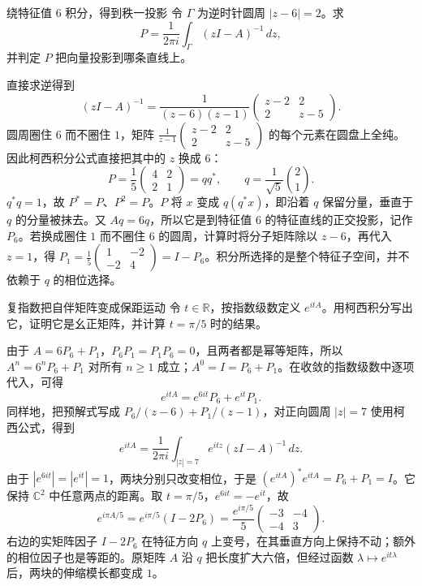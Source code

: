 \begin{example}{绕特征值 $6$ 积分，得到秩一投影}
令 $\Gamma$ 为逆时针圆周 $|z-6|=2$。求
\[
 P=\frac{1}{2\pi i}\int_\Gamma(zI-A)^{-1}\,dz,
\]
并判定 $P$ 把向量投影到哪条直线上。
\end{example}
\begin{solution}
直接求逆得到
\[
 (zI-A)^{-1}=\frac{1}{(z-6)(z-1)}
 \begin{pmatrix}z-2&2\\2&z-5\end{pmatrix}.
\]
圆周圈住 $6$ 而不圈住 $1$，矩阵 $\frac1{z-1}\begin{pmatrix}z-2&2\\2&z-5\end{pmatrix}$ 的每个元素在圆盘上全纯。因此柯西积分公式直接把其中的 $z$ 换成 $6$：
\[
 P=\frac15\begin{pmatrix}4&2\\2&1\end{pmatrix}=qq^*,\qquad q=\frac1{\sqrt5}\binom{2}{1}.
\]
$q^*q=1$，故 $P^*=P$、$P^2=P$。$P$ 将 $x$ 变成 $q(q^*x)$，即沿着 $q$ 保留分量，垂直于 $q$ 的分量被抹去。又 $Aq=6q$，所以它是到特征值 $6$ 的特征直线的正交投影，记作 $P_6$。若换成圈住 $1$ 而不圈住 $6$ 的圆周，计算时将分子矩阵除以 $z-6$，再代入 $z=1$，得 $P_1=\frac15\begin{pmatrix}1&-2\\-2&4\end{pmatrix}=I-P_6$。积分所选择的是整个特征子空间，并不依赖于 $q$ 的相位选择。
\end{solution}

\begin{example}{复指数把自伴矩阵变成保距运动}
令 $t\in\mathbb R$，按指数级数定义 $e^{itA}$。用柯西积分写出它，证明它是幺正矩阵，并计算 $t=\pi/5$ 时的结果。
\end{example}
\begin{solution}
由于 $A=6P_6+P_1$，$P_6P_1=P_1P_6=0$，且两者都是幂等矩阵，所以 $A^n=6^nP_6+P_1$ 对所有 $n\ge1$ 成立；$A^0=I=P_6+P_1$。在收敛的指数级数中逐项代入，可得
\[
 e^{itA}=e^{6it}P_6+e^{it}P_1.
\]
同样地，把预解式写成 $P_6/(z-6)+P_1/(z-1)$，对正向圆周 $|z|=7$ 使用柯西公式，得到
\[
 e^{itA}=\frac{1}{2\pi i}\int_{|z|=7}e^{itz}(zI-A)^{-1}\,dz.
\]
由于 $|e^{6it}|=|e^{it}|=1$，两块分别只改变相位，于是 $(e^{itA})^*e^{itA}=P_6+P_1=I$。它保持 $\mathbb C^2$ 中任意两点的距离。取 $t=\pi/5$，$e^{6it}=-e^{it}$，故
\[
 e^{i\pi A/5}=e^{i\pi/5}(I-2P_6)
 =\frac{e^{i\pi/5}}5\begin{pmatrix}-3&-4\\-4&3\end{pmatrix}.
\]
右边的实矩阵因子 $I-2P_6$ 在特征方向 $q$ 上变号，在其垂直方向上保持不动；额外的相位因子也是等距的。原矩阵 $A$ 沿 $q$ 把长度扩大六倍，但经过函数 $\lambda\mapsto e^{it\lambda}$ 后，两块的伸缩模长都变成 $1$。
\end{solution}
